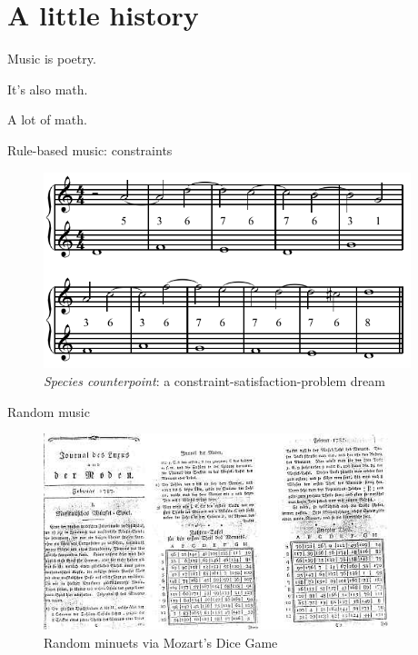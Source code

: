 \section{A little history}

\begin{frame}

Music is poetry.

It's also math.

A lot of math.

\end{frame}

\begin{frame}{Rule-based music: constraints}
    \begin{figure}
    \begin{centering}
    \includegraphics[height=2.25in]{assets/include-species-counterpoint.png}
    \caption{\emph{Species counterpoint}: a constraint-satisfaction-problem dream}
    \end{centering}
    \end{figure}
\end{frame}

\begin{frame}{Random music}
    \begin{figure}
    \begin{centering}
    \includegraphics[height=2.25in]{assets/include-dice-game.jpg}
    \caption{Random minuets via Mozart's Dice Game}
    \end{centering}
    \end{figure}
\end{frame}

